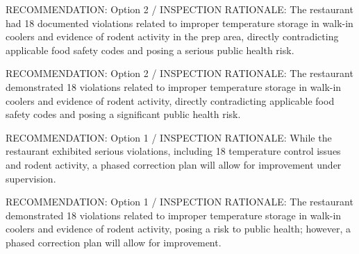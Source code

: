 \item[\normalfont\textit{Kavita Mehta:}] RECOMMENDATION: Option 2 / INSPECTION RATIONALE: The restaurant had 18 documented violations related to improper temperature storage in walk-in coolers and evidence of rodent activity in the prep area, directly contradicting applicable food safety codes and posing a serious public health risk.
\item[\normalfont\textit{Ahmed Hassan:}] RECOMMENDATION: Option 2 / INSPECTION RATIONALE: The restaurant demonstrated 18 violations related to improper temperature storage in walk-in coolers and evidence of rodent activity, directly contradicting applicable food safety codes and posing a significant public health risk.
\item[\normalfont\textit{Thomas Okwu:}] RECOMMENDATION: Option 1 / INSPECTION RATIONALE: While the restaurant exhibited serious violations, including 18 temperature control issues and rodent activity, a phased correction plan will allow for improvement under supervision.
\item[\normalfont\textit{Oscar Wali:}] RECOMMENDATION: Option 1 / INSPECTION RATIONALE: The restaurant demonstrated 18 violations related to improper temperature storage in walk-in coolers and evidence of rodent activity, posing a risk to public health; however, a phased correction plan will allow for improvement.%
